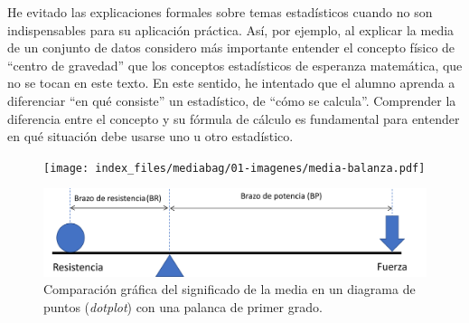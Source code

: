 \documentclass[
  letterpaper,
  DIV=11,
  numbers=noendperiod,
  oneside]{scrreprt}
\begin{document}
He evitado las explicaciones formales sobre temas estadísticos cuando no
son indispensables para su aplicación práctica. Así, por ejemplo, al
explicar la media de un conjunto de datos considero más importante
entender el concepto físico de ``centro de gravedad'' que los conceptos
estadísticos de esperanza matemática, que no se tocan en este texto. En
este sentido, he intentado que el alumno aprenda a diferenciar ``en qué
consiste'' un estadístico, de ``cómo se calcula''. Comprender la
diferencia entre el concepto y su fórmula de cálculo es fundamental para
entender en qué situación debe usarse uno u otro estadístico.

\begin{figure}

\begin{minipage}[b]{0.50\linewidth}

{\centering 

\texttt{[image: index\_files/mediabag/01-imagenes/media-balanza.pdf]}

}

\end{minipage}%
%
\begin{minipage}[b]{0.50\linewidth}

{\centering 

\includegraphics{01-imagenes/palanca.png}

}

\end{minipage}%

\caption{\label{fig-intro-media}Comparación gráfica del significado de
la media en un diagrama de puntos (\emph{dotplot}) con una palanca de
primer grado.}

\end{figure}
\end{document}
